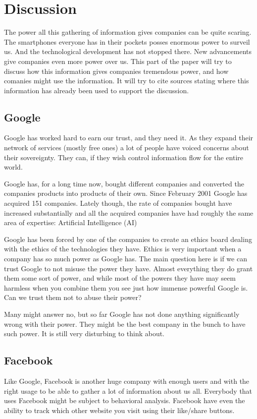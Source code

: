 \section{Discussion}
The power all this gathering of information gives companies can be quite scaring. The smartphones everyone has in their pockets posses enormous power to surveil us. And the technological development has not stopped there. New advancements give companies even more power over us. This part of the paper will try to discuss how this information gives companies tremendous power, and how comanies might use the information. It will try to cite sources stating where this information has already been used to support the discussion.

\subsection{Google}
Google has worked hard to earn our trust, and they need it. As they expand their network of services (mostly free ones) a lot of people have voiced concerns about their sovereignty. They can, if they wish control information flow for the entire world.

Google has, for a long time now, bought different companies and converted the companies products into products of their own. Since February 2001 Google has acquired 151 companies. Lately though, the rate of companies bought have increased substantially and all the acquired companies have had roughly the same area of expertise: Artificial Intelligence (AI)\cite{website:google-buys}

Google has been forced by one of the companies to create an ethics board dealing with the ethics of the technologies they have.\cite{website:google-ethics} Ethics is very important when a company has so much power as Google has. The main question here is if we can trust Google to not misuse the power they have. Almost everything they do grant them some sort of power, and while most of the powers they have may seem harmless when you combine them you see just how immense powerful Google is. Can we trust them not to abuse their power?

Many might answer no, but so far Google has not done anything significantly wrong with their power. They might be the best company in the bunch to have such power. It is still very disturbing to think about.

\subsection{Facebook}
Like Google, Facebook is another huge company with enough users and with the right usage to be able to gather a lot of information about us all. Everybody that uses Facebook might be subject to behavioral analysis. Facebook have even the ability to track which other website you visit using their like/share buttons.\cite{website:facebook-tracking}

